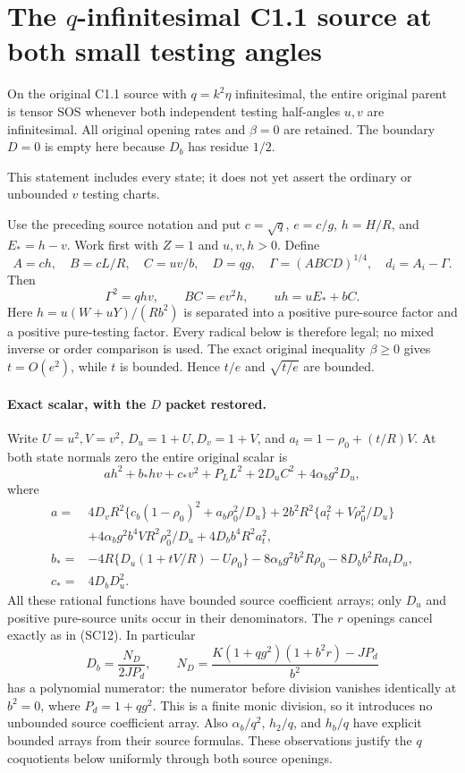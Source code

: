 \section{The $q$-infinitesimal C1.1 source at both small testing angles}
\label{sec:r7-c1-q-inf-local}
\begin{theorem}
On the original C1.1 source with $q=k^2\eta$ infinitesimal, the entire
original parent is tensor SOS whenever both independent testing
half-angles $u,v$ are infinitesimal. All original opening rates and
$\beta=0$ are retained. The boundary $D=0$ is empty here because
$D_b$ has residue $1/2$.
\end{theorem}
This statement includes every state; it does not yet assert the
ordinary or unbounded $v$ testing charts.

Use the preceding source notation and put $c=\sqrt q$, $e=c/g$,
$h=H/R$, and $E_*=h-v$. Work first with $Z=1$ and $u,v,h>0$.
Define
\[
 A=ch,\quad B=cL/R,\quad C=uv/b,\quad D=qg,\quad
 \Gamma=(ABCD)^{1/4},\quad d_i=A_i-\Gamma.
\]
Then
\[
 \Gamma^2=qhv,\qquad BC=e v^2h,\qquad
 u h=uE_*+bC.
 \tag{QI1}
\]
Here $h=u(W+uY)/(Rb^2)$ is separated into a positive pure-source
factor and a positive pure-testing factor. Every radical below is
therefore legal; no mixed inverse or order comparison is used.
The exact original inequality $\beta\ge0$ gives $t=O(e^2)$, while
$t$ is bounded. Hence $t/e$ and $\sqrt{t/e}$ are bounded.

\paragraph{Exact scalar, with the $D$ packet restored.}
Write $U=u^2,V=v^2$, $D_u=1+U,D_v=1+V$, and
$a_t=1-\rho_0+(t/R)V$. At both state normals zero the entire original
scalar is
\[
 a h^2+b_*hv+c_*v^2+P_L L^2+2D_uC^2+4\alpha_b g^2D_u,
 \tag{QI2}
\]
where
\begin{align*}
 a={}&4D_vR^2\{c_b(1-\rho_0)^2+a_b\rho_0^2/D_u\}
 +2b^2R^2\{a_t^2+V\rho_0^2/D_u\}\\
 &+4\alpha_b g^2b^4VR^2\rho_0^2/D_u
 +4D_bb^4R^2a_t^2,\\
 b_*={}&-4R\{D_u(1+tV/R)-U\rho_0\}
 -8\alpha_b g^2b^2R\rho_0-8D_bb^2Ra_tD_u,\\
 c_*={}&4D_bD_u^2.
\end{align*}
All these rational functions have bounded source coefficient arrays;
only $D_u$ and positive pure-source units occur in their denominators.
The $r$ openings cancel exactly as in (SC12).
In particular
\[
 D_b=\frac{N_D}{2JP_d},\qquad
 N_D=\frac{K(1+qg^2)(1+b^2r)-JP_d}{b^2}
\]
has a polynomial numerator: the numerator before division vanishes
identically at $b^2=0$, where $P_d=1+qg^2$. This is a finite monic
division, so it introduces no unbounded source coefficient array.
Also $\alpha_b/q^2$, $h_2/q$, and $h_b/q$ have explicit bounded
arrays from their source formulas. These observations justify the
$q$ coquotients below uniformly through both source openings.

